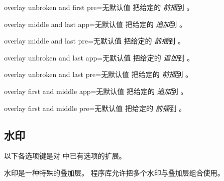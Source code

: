 \begin{docTcbKey}{overlay unbroken and first pre}{=}{无默认值}
  把给定的  \emph{前插}到 。
\end{docTcbKey}

\begin{docTcbKey}{overlay middle and last app}{=}{无默认值}
  把给定的  \emph{追加}到 。
\end{docTcbKey}

\begin{docTcbKey}{overlay middle and last pre}{=}{无默认值}
  把给定的  \emph{前插}到 。
\end{docTcbKey}

\begin{docTcbKey}{overlay unbroken and last app}{=}{无默认值}
  把给定的  \emph{追加}到 。
\end{docTcbKey}

\begin{docTcbKey}{overlay unbroken and last pre}{=}{无默认值}
  把给定的  \emph{前插}到 。
\end{docTcbKey}

\begin{docTcbKey}[][doc new=2014-09-19]{overlay first and middle app}{=}{无默认值}
  把给定的  \emph{追加}到 。
\end{docTcbKey}

\begin{docTcbKey}[][doc new=2014-09-19]{overlay first and middle pre}{=}{无默认值}
  把给定的  \emph{前插}到 。
\end{docTcbKey}


\clearpage
\subsection{水印}
以下各选项键是对  中已有选项的扩展。

\begin{marker}
水印是一种特殊的叠加层。 程序库允许把多个水印与叠加层组合使用。
\end{marker}

